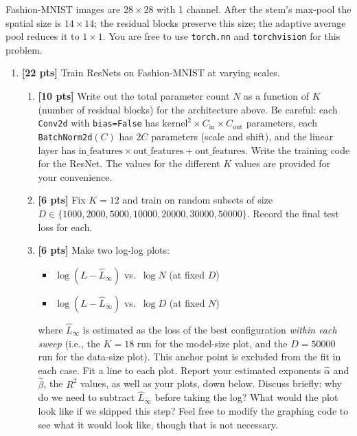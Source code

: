 \documentclass[submit]{harvardml}
\begin{document}
\begin{problem}
Fashion-MNIST images are $28 \times 28$ with 1 channel. After the stem's max-pool the spatial size is $14 \times 14$; the residual blocks preserve this size; the adaptive average pool reduces it to $1 \times 1$. You are free to use \texttt{torch.nn} and \texttt{torchvision} for this problem.
\begin{enumerate}[label=(\alph*)]
\item \textbf{[22 pts]} Train ResNets on Fashion-MNIST at varying scales.
\begin{enumerate}[label=(\roman*)]
    \item \textbf{[10 pts]} Write out the total parameter count $N$ as a function of $K$ (number of residual blocks) for the architecture above. Be careful: each \texttt{Conv2d} with \texttt{bias=False} has $\text{kernel}^2 \times C_{\text{in}} \times C_{\text{out}}$ parameters, each \texttt{BatchNorm2d}$(C)$ has $2C$ parameters (scale and shift), and the linear layer has $\text{in\_features} \times \text{out\_features} + \text{out\_features}$.
    Write the training code for the ResNet. The values for the different $K$ values are provided for your convenience.
    \item \textbf{[6 pts]} Fix $K = 12$ and train on random subsets of size\\ $D \in \{1000, 2000, 5000, 10000, 20000, 30000, 50000\}$. Record the final test loss for each.
    \item \textbf{[6 pts]} Make two log-log plots:
    \begin{itemize}
        \item $\log(L - \hat{L}_\infty)$ vs.\ $\log N$ (at fixed $D$)
        \item $\log(L - \hat{L}_\infty)$ vs.\ $\log D$ (at fixed $N$)
    \end{itemize}
    where $\hat{L}_\infty$ is estimated as the loss of the best configuration \emph{within each sweep} (i.e., the $K=18$ run for the model-size plot, and the $D=50000$ run for the data-size plot). This anchor point is excluded from the fit in each case.
    Fit a line to each plot. Report your estimated exponents $\hat{\alpha}$ and $\hat{\beta}$, the $R^2$ values, as well as your plots, down below.
    Discuss briefly: why do we need to subtract $\hat{L}_\infty$ before taking the log? What would the plot look like if we skipped this step? Feel free to modify the graphing code to see what it would look like, though that is not necessary.
\end{enumerate}

\end{enumerate}
\end{problem}
\end{document}
